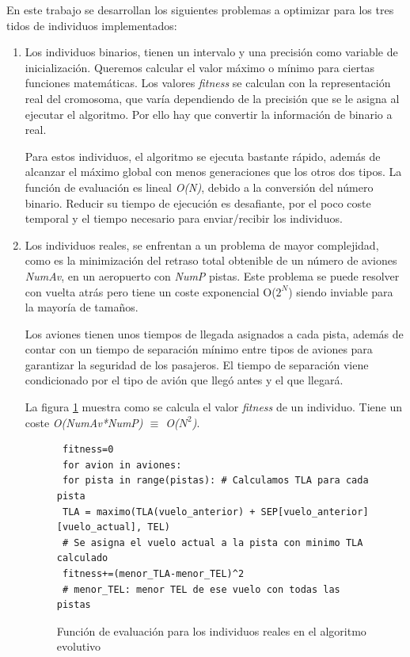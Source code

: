 	
		En este trabajo se desarrollan los siguientes problemas a optimizar para los tres tidos de individuos implementados:
	
	\begin{enumerate}
		\item Los individuos binarios, tienen un intervalo y una precisión como variable de inicialización. Queremos calcular el valor máximo o mínimo para ciertas funciones matemáticas. Los valores \textit{fitness} se calculan con la representación real del cromosoma, que varía dependiendo de la precisión que se le asigna al ejecutar el algoritmo. Por ello hay que convertir la información de binario a real. 
		
		Para estos individuos, el algoritmo se ejecuta bastante rápido, además de alcanzar el máximo global con menos generaciones que los otros dos tipos. La función de evaluación es lineal \textit{O(N)}, debido a la conversión del número binario. Reducir su tiempo de ejecución es desafiante, por el poco coste temporal y el tiempo necesario para enviar/recibir los individuos.		
		
		\item Los individuos reales, se enfrentan a un problema de mayor complejidad, como es la minimización del retraso total obtenible de un número de aviones \textit{NumAv}, en un aeropuerto con \textit{NumP} pistas. Este problema se puede resolver con vuelta atrás pero tiene un coste exponencial O(\(2^{N}\)) siendo inviable para la mayoría de tamaños. 
		
		Los aviones tienen unos tiempos de llegada asignados a cada pista, además de contar con un tiempo de separación mínimo entre tipos de aviones para garantizar la seguridad de los pasajeros. El tiempo de separación viene condicionado por el tipo de avión que llegó antes y el que llegará.		
			
		La figura \ref{fig:pev_funcion_ev_2} muestra como se calcula el valor \textit{fitness} de un individuo. Tiene un coste \textit{O(NumAv*NumP) $\equiv$ O(\(N^{2}\))}. 
		
		\begin{figure}[!h]
		
		
			\begin{lstlisting}
 fitness=0
 for avion in aviones:
 for pista in range(pistas): # Calculamos TLA para cada pista
 TLA = maximo(TLA(vuelo_anterior) + SEP[vuelo_anterior][vuelo_actual], TEL)
 # Se asigna el vuelo actual a la pista con minimo TLA calculado
 fitness+=(menor_TLA-menor_TEL)^2
 # menor_TEL: menor TEL de ese vuelo con todas las pistas		
			\end{lstlisting}
			\caption{Función de evaluación para los individuos reales en el algoritmo evolutivo}
			\label{fig:pev_funcion_ev_2}
		\end{figure}
		

\end{enumerate}
